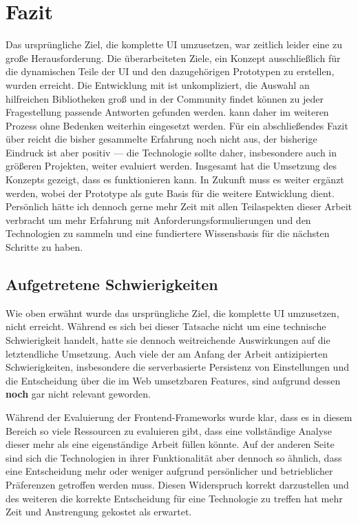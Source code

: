 \chapter{Fazit}\label{chap:conclusion}
Das ursprüngliche Ziel, die komplette UI umzusetzen, war zeitlich leider eine zu große Herausforderung. Die überarbeiteten Ziele, ein Konzept ausschließlich für die dynamischen Teile der  UI und den dazugehörigen Prototypen zu erstellen, wurden erreicht.
Die Entwicklung mit  ist unkompliziert, die Auswahl an hilfreichen Bibliotheken groß und in der Community findet können zu jeder Fragestellung passende Antworten gefunden werden.  kann daher im weiteren Prozess ohne Bedenken weiterhin eingesetzt werden. Für ein abschließendes Fazit über  reicht die bisher gesammelte Erfahrung noch nicht aus, der bisherige Eindruck ist aber positiv --- die Technologie sollte daher, insbesondere auch in größeren Projekten, weiter evaluiert werden.
Insgesamt hat die Umsetzung des Konzepts gezeigt, dass es funktionieren kann. In Zukunft muss es weiter ergänzt werden, wobei der Prototype als gute Basis für die weitere Entwicklung dient. Persönlich hätte ich dennoch gerne mehr Zeit mit allen Teilaspekten dieser Arbeit verbracht um mehr Erfahrung mit Anforderungsformulierungen und den Technologien zu sammeln und eine fundiertere Wissensbasis für die nächsten Schritte zu haben.

\section{Aufgetretene Schwierigkeiten}
Wie oben erwähnt wurde das ursprüngliche Ziel, die komplette UI umzusetzen, nicht erreicht. Während es sich bei dieser Tatsache nicht um eine technische Schwierigkeit handelt, hatte sie dennoch weitreichende Auswirkungen auf die letztendliche Umsetzung. Auch viele der am Anfang der Arbeit antizipierten Schwierigkeiten, insbesondere die serverbasierte Persistenz von Einstellungen und die Entscheidung über die im Web umsetzbaren Features, sind aufgrund dessen \textbf{noch} gar nicht relevant geworden.

Während der Evaluierung der Frontend-Frameworks wurde klar, dass es in diesem Bereich so viele Ressourcen zu evaluieren gibt, dass eine vollständige Analyse dieser mehr als eine eigenständige Arbeit füllen könnte. Auf der anderen Seite sind sich die Technologien in ihrer Funktionalität aber dennoch so ähnlich, dass eine Entscheidung mehr oder weniger aufgrund persönlicher und betrieblicher Präferenzen getroffen werden muss. Diesen Widerspruch korrekt darzustellen und des weiteren die korrekte Entscheidung für eine Technologie zu treffen hat mehr Zeit und Anstrengung gekostet als erwartet.

